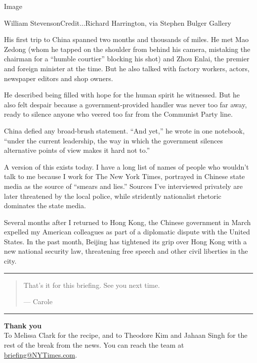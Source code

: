 Image

William StevensonCredit...Richard Harrington, via Stephen Bulger Gallery

His first trip to China spanned two months and thousands of miles. He
met Mao Zedong (whom he tapped on the shoulder from behind his camera,
mistaking the chairman for a ``humble courtier'' blocking his shot) and
Zhou Enlai, the premier and foreign minister at the time. But he also
talked with factory workers, actors, newspaper editors and shop owners.

He described being filled with hope for the human spirit he witnessed.
But he also felt despair because a government-provided handler was never
too far away, ready to silence anyone who veered too far from the
Communist Party line.

China defied any broad-brush statement. ``And yet,'' he wrote in one
notebook, ``under the current leadership, the way in which the
government silences alternative points of view makes it hard not to.''

A version of this exists today. I have a long list of names of people
who wouldn't talk to me because I work for The New York Times, portrayed
in Chinese state media as the source of ``smears and lies.'' Sources
I've interviewed privately are later threatened by the local police,
while stridently nationalist rhetoric dominates the state media.

Several months after I returned to Hong Kong, the Chinese government in
March expelled my American colleagues as part of a diplomatic dispute
with the United States. In the past month, Beijing has tightened its
grip over Hong Kong with a new national security law, threatening free
speech and other civil liberties in the city.

\begin{center}\rule{0.5\linewidth}{\linethickness}\end{center}

\begin{quote}
That's it for this briefing. See you next time.

--- Carole
\end{quote}

\begin{center}\rule{0.5\linewidth}{\linethickness}\end{center}

\textbf{Thank you}\\
To Melissa Clark for the recipe, and to Theodore Kim and Jahaan Singh
for the rest of the break from the news. You can reach the team at
\href{mailto:briefing+pm@NYTimes.com?subject=Briefing\%20Feedback}{briefing@NYTimes.com}.

